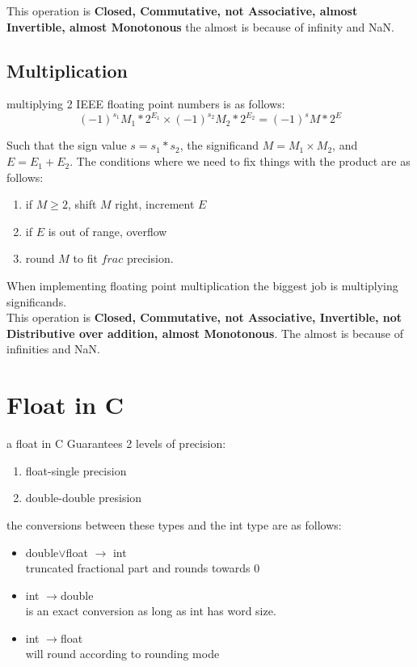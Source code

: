 \documentclass[12pt]{book}
\begin{document}
This operation is \textbf{Closed, Commutative, not Associative, almost Invertible, 
        almost Monotonous}
the almost is because of infinity and NaN.

\pagebreak

\subsection*{Multiplication}
multiplying 2 IEEE floating point numbers is as follows:
\[(-1)^{s_1} M_1 *2^{E_1} \times (-1)^{s_2} M_2 *2^{E_2}= (-1)^sM*2^E\]

Such that the sign value $s=s_1 * s_2$, the significand $M=M_1\times M_2$, 
        and  $E=E_1+E_2$.
The conditions where we need to fix things with the product are as follows:
\begin{enumerate}
        \item if $M \geq 2$, shift $M$ right, increment $E$
        \item if $E$ is out of range, overflow
        \item round  $M$ to fit $frac$ precision.
\end{enumerate}

When implementing floating point multiplication the biggest job is multiplying 
        significands.\\
This operation is \textbf{Closed, Commutative, not Associative, Invertible,
        not Distributive over addition, almost Monotonous}.
The almost is because of infinities and NaN.

\section*{Float in C}
a float in C Guarantees 2 levels of precision:
\begin{enumerate}
        \item float-single precision
        \item double-double presision
\end{enumerate}
the conversions between these types and the int type are as follows:\\
\begin{itemize}
        \item double$\vee$float $\rightarrow$ int\\truncated  
                fractional part and rounds towards 0\\
        \item int $\rightarrow$double\\is an exact conversion as long as int has  
                word size.\\
        \item int $\rightarrow$float\\will round according to rounding mode
\end{itemize}
\end{document}
